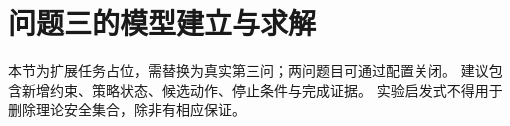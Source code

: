 \section{问题三的模型建立与求解}
本节为扩展任务占位，需替换为真实第三问；两问题目可通过配置关闭。
建议包含新增约束、策略状态、候选动作、停止条件与完成证据。
实验启发式不得用于删除理论安全集合，除非有相应保证。
